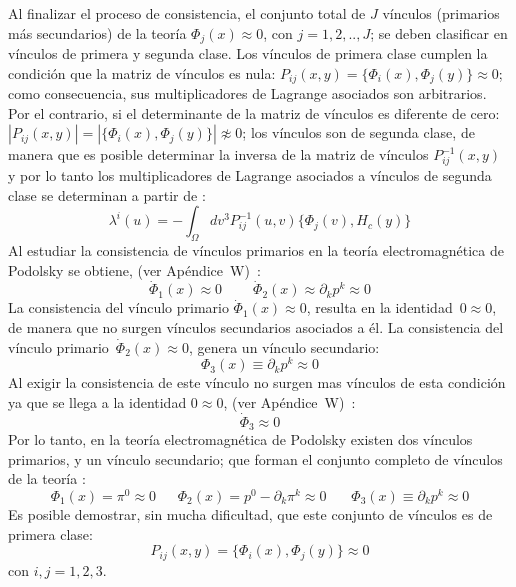 \documentclass[a4paper,12pt]{article}
\begin{document}
Al finalizar el proceso de consistencia, el conjunto total de $J$ vínculos (primarios más secundarios) de la teoría \mbox{$\Phi_j(x)\approx0$}, con \mbox{$j=1,2,..,J$}; se deben clasificar en vínculos de primera y segunda clase. Los vínculos de primera clase cumplen la condición que la matriz de vínculos es nula: \mbox{$P_{ij}(x,y)=\{\Phi_i(x),\Phi_j(y)\}\approx0$}; como consecuencia, sus multiplicadores de Lagrange asociados son arbitrarios. Por el contrario, si el determinante de la matriz de vínculos es diferente de cero: \mbox{$|P_{ij}(x,y)|=|\{\Phi_i(x),\Phi_j(y)\}|\not\approx0$}; los vínculos son de segunda clase, de manera que es posible determinar la inversa de la matriz de vínculos $P_{ij}^{-1}(x,y)$ y por lo tanto los multiplicadores de Lagrange asociados a vínculos de segunda clase se determinan a partir de \cite{dirac,puebla,Merilin}:
\begin{equation}
\lambda^i(u)=-\int_\Omega dv^3P_{ij}^{-1}(u,v)\{\Phi_j(v),H_c(y)\} 
\end{equation}
Al estudiar la consistencia de vínculos primarios en la teoría electromagnética de Podolsky se obtiene, (ver \mbox{Apéndice W) \cite{podolsky,forhaljdpo}:}
\begin{equation}
\dot{\Phi}_1(x)\approx0\ \ \ \ \ \ \  \ \ \ \dot{\Phi}_2(x)\approx\partial_kp^{k}\approx0  
\end{equation}
La consistencia del vínculo primario $\dot{\Phi}_1(x)\approx0$, resulta en la \mbox{identidad $0\approx0$,} de manera que no surgen vínculos secundarios asociados a él. La consistencia del vínculo \mbox{primario $\dot{\Phi}_2(x)\approx0$,} genera un vínculo secundario:
\begin{equation}
\Phi_3(x)\equiv\partial_kp^{k}\approx0 
\end{equation}
Al exigir la consistencia de este vínculo no surgen mas vínculos de esta condición ya que se llega a la identidad \mbox{$0\approx0$}, (ver \mbox{Apéndice W) \cite{podolsky,forhaljdpo}:}
\begin{equation}
\dot \Phi_3\approx0
\end{equation}
Por lo tanto, en la teoría electromagnética de Podolsky existen dos vínculos primarios, y un vínculo secundario; que forman el conjunto completo de vínculos de la teoría \cite{podolsky,forhaljdpo}:
\begin{equation}
\Phi_1(x)=\pi^0\approx0 \ \ \ \ \ \ \ \Phi_2(x)=p^0-\partial_k\pi^k\approx0\ \ \ \ \ \ \ \ \Phi_3(x)\equiv\partial_kp^{k}\approx0 
\label{priclas}
\end{equation}
Es posible demostrar, sin mucha dificultad, que este conjunto de vínculos es de primera clase:
\begin{equation}
P_{ij}(x,y)=\{\Phi_i(x),\Phi_j(y)\}\approx0 
\end{equation}
con $i,j=1,2,3$.
\end{document}
